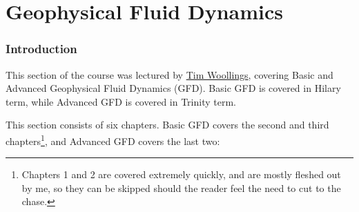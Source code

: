 \part{Geophysical Fluid Dynamics}\label{Geophysical Fluid Dynamics}

\section*{Introduction}

This section of the course was lectured by \href{https://www.physics.ox.ac.uk/our-people/woollings}{Tim Woollings}, covering Basic and Advanced Geophysical Fluid Dynamics (GFD). Basic GFD is covered in Hilary term, while Advanced GFD is covered in Trinity term.\vspace{5 mm}

\noindent This section consists of six chapters. Basic GFD covers the second and third chapters\footnote{Chapters 1 and 2 are covered extremely quickly, and are mostly fleshed out by me, so they can be skipped should the reader feel the need to cut to the chase.}, and Advanced GFD covers the last two:\vspace{5 mm}


